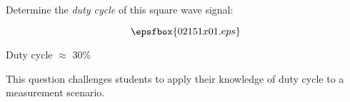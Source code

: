 

Determine the {\it duty cycle} of this square wave signal:

$$\epsfbox{02151x01.eps}$$







Duty cycle $\approx$ 30\%







This question challenges students to apply their knowledge of duty cycle to a measurement scenario.




